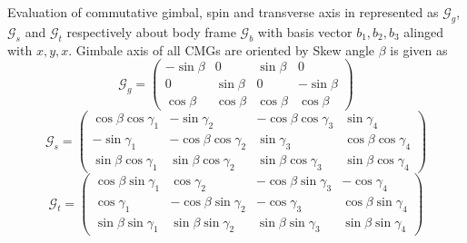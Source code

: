 Evaluation of commutative gimbal, spin and transverse axis in represented as $\mathcal{G}_g$,$\mathcal{G}_s$ and $\mathcal{G}_t$ respectively about body frame $\mathcal{G}_b$ with basis vector ${b_1,b_2,b_3}$ alinged with ${x,y,x}$. Gimbale axis of all CMGs are oriented by Skew angle $\beta$ is given as
\begin{equation}
\mathcal{G}_g = 
\begin{pmatrix}
 -\sin{}\beta &      0 & \sin{\beta} &       0 \\
       0 & \sin{\beta} &      0 & -\sin{\beta} \\
  \cos{\beta} & \cos{\beta} & \cos{\beta} &  \cos{\beta}
\end{pmatrix}
\end{equation}
\begin{equation}
\mathcal{G}_s =
\begin{pmatrix}
\cos{\beta} \cos{\gamma_1} & -\sin{\gamma_2} & -\cos{\beta} \cos{\gamma_3} &  \sin{\gamma_4} \\
-\sin{\gamma_1} & -\cos{\beta} \cos{\gamma_2} &  \sin{\gamma_3} &  \cos{\beta} \cos{\gamma_4} \\
\sin{\beta} \cos{\gamma_1} &  \sin{\beta} \cos{\gamma_2} &  \sin{\beta} \cos{\gamma_3} &  \sin{\beta} \cos{\gamma_4} 
\end{pmatrix}
\end{equation}
\begin{equation}
\mathcal{G}_t =
\begin{pmatrix}
\cos{\beta} \sin{\gamma_1} &         \cos{\gamma_2} & -\cos{\beta} \sin{\gamma_3} &       -\cos{\gamma_4} \\
       \cos{\gamma_1} & -\cos{\beta} \sin{\gamma_2} &        -\cos{\gamma_3} & \cos{\beta} \sin{\gamma_4} \\
\sin{\beta} \sin{\gamma_1} &  \sin{\beta} \sin{\gamma_2} &  \sin{\beta} \sin{\gamma_3} & \sin{\beta} \sin{\gamma_4}

\end{pmatrix}
\end{equation}
